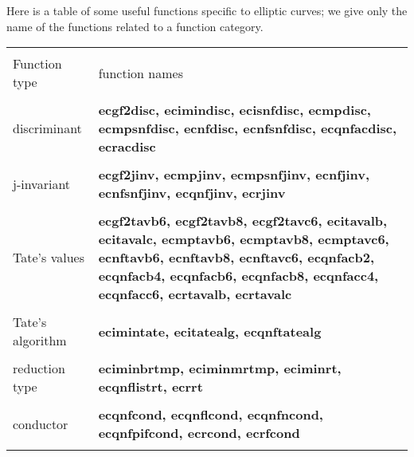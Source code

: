 \newpage

Here is a table of some useful functions specific to elliptic curves; we give 
only the name of the functions related to a function category.

\leer
\begin{center}
\begin{tabular}{|p{1.1in}|p{4.0in}|}
\hline &\\[-1.3ex]
Function type  &
function names\\[1.5ex]
\hline &\\[-1.3ex]

discriminant &
{\bf ecgf2disc, ecimindisc, ecisnfdisc, ecmpdisc, \newline
        ecmpsnfdisc, ecnfdisc, ecnfsnfdisc, ecqnfacdisc, \newline
        ecracdisc } \\[1.5ex]
\hline &\\[-1.3ex]

j-invariant &
{\bf ecgf2jinv, ecmpjinv, ecmpsnfjinv, ecnfjinv, \newline
        ecnfsnfjinv, ecqnfjinv, ecrjinv } \\[1.5ex]
\hline &\\[-1.3ex]

Tate's values &
{\bf ecgf2tavb6, ecgf2tavb8, ecgf2tavc6, ecitavalb, \newline
        ecitavalc, ecmptavb6, ecmptavb8, ecmptavc6, \newline
        ecnftavb6, ecnftavb8, ecnftavc6, ecqnfacb2, \newline
        ecqnfacb4, ecqnfacb6, ecqnfacb8, ecqnfacc4, \newline
        ecqnfacc6, ecrtavalb, ecrtavalc } \\[1.5ex]
\hline &\\[-1.3ex]

Tate's algorithm &
{\bf ecimintate, ecitatealg, ecqnftatealg } \\[1.5ex]
\hline &\\[-1.3ex]

reduction type &
{\bf eciminbrtmp, eciminmrtmp, eciminrt, ecqnflistrt, \newline
        ecrrt } \\[1.5ex]
\hline &\\[-1.3ex]

conductor &
{\bf ecqnfcond, ecqnflcond, ecqnfncond, ecqnfpifcond, \newline
        ecrcond, ecrfcond } \\[1.5ex]
\hline &\\[-1.3ex]


\end{tabular}
\end{center}
